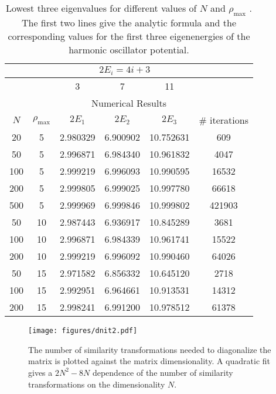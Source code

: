 \documentclass[10pt,showpacs,preprintnumbers,footinbib,amsmath,amssymb,aps,prl,twocolumn,groupedaddress,superscriptaddress,showkeys]{revtex4-1}
\newcommand{\rhomax}{
	\ensuremath{ \rho _{\mathrm{max}}} }
\begin{document}
{\begin{table}[h]
\centering
	\begin{tabular}{ c c | c c c | c }
	 & & \multicolumn{3}{c}{$2 E_i = 4i + 3$} &\\
\hline
	 & & 3 & 7 & 11 & \\
\hline
	\multicolumn{6}{c}{Numerical Results}\\
\hline
	$N$ & \rhomax & $2E_1$ & $2E_2$ & $2E_3$ & \# iterations\\
\hline
	20  & 5  & 2.980329 & 6.900902 & 10.752631 & 609\\
	50  & 5  & 2.996871 & 6.984340 & 10.961832 & 4047\\
	100 & 5 & 2.999219 & 6.996093 & 10.990595 & 16532\\
	200 & 5 & 2.999805 & 6.999025 & 10.997780 & 66618\\
	500 & 5 & 2.999969 & 6.999846 & 10.999802 & 421903\\
\hline
	50   & 10 & 2.987443 & 6.936917 & 10.845289 & 3681\\
	100 & 10 & 2.996871 & 6.984339 & 10.961741 & 15522\\
	200 & 10 & 2.999219 & 6.996092 & 10.990460 & 64026\\
\hline
	50   & 15 & 2.971582 & 6.856332 & 10.645120 & 2718\\
	100 & 15 & 2.992951 & 6.964661 & 10.913531 & 14312\\
	200 & 15 & 2.998241 & 6.991200 & 10.978512 & 61378\\
	\end{tabular}
	\caption{Lowest three eigenvalues for different values of
	$N$ and \rhomax. The first two lines give the analytic
	formula and the corresponding values for the first three
	eigenenergies of the harmonic oscillator potential.}
	\label{tab:NRhoResults}
\end{table}

\begin{figure}
\centering
	\texttt{[image: figures/dnit2.pdf]}
	\caption{The number of similarity transformations needed to
	diagonalize the matrix is plotted against the matrix
	dimensionality. A quadratic fit gives a $2 N^2 - 8 N$ dependence
	of the number of similarity transformations on the dimensionality
	$N$.}
	\label{fig:dnit}
\end{figure}

}
\end{document}
